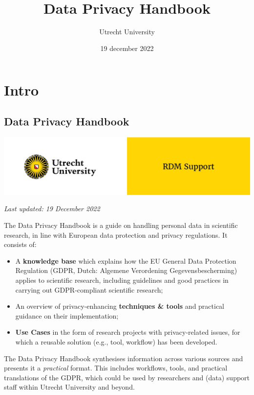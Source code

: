 \documentclass[
]{book}
\title{Data Privacy Handbook}
\author{Utrecht University}
\date{19 december 2022}
\providecommand{\tightlist}{%
  \setlength{\itemsep}{0pt}\setlength{\parskip}{0pt}}
\begin{document}
\maketitle

{
\setcounter{tocdepth}{1}
\tableofcontents
}
\hypertarget{part-intro}{%
\part*{Intro}\label{part-intro}}

\hypertarget{data-privacy-handbook}{%
\chapter*{Data Privacy Handbook}\label{data-privacy-handbook}}

\includegraphics{img/cover-image-dph.png}

\emph{Last updated: 19 December 2022}

The Data Privacy Handbook is a guide on handling personal data in scientific
research, in line with European data protection and privacy regulations. It
consists of:

\begin{itemize}
\tightlist
\item
  A \textbf{knowledge base} which explains how the EU General Data Protection
  Regulation (GDPR, Dutch: Algemene Verordening Gegevensbescherming) applies to
  scientific research, including guidelines and good practices in carrying out
  GDPR-compliant scientific research;
\item
  An overview of privacy-enhancing \textbf{techniques \& tools} and practical guidance
  on their implementation;
\item
  \textbf{Use Cases} in the form of research projects with privacy-related issues,
  for which a reusable solution (e.g., tool, workflow) has been developed.
\end{itemize}

The Data Privacy Handbook synthesises information across various sources and
presents it a \emph{practical} format. This includes workflows, tools, and practical
translations of the GDPR, which could be used by researchers and (data) support
staff within Utrecht University and beyond.
\end{document}
